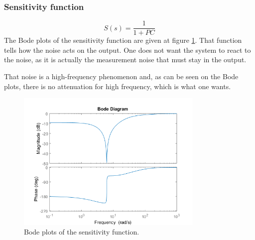 \subsubsection{Sensitivity function}
$$
S(s) = \dfrac{1}{1 + PC}
$$
The Bode plots of the sensitivity function are given at figure \ref{fig:sensitivity}. That function tells how the noise acts on the output. One does not want the system to react to the noise, as it is actually the measurement noise that must stay in the output.\par
That noise is a high-frequency phenomenon and, as can be seen on the Bode plots, there is no attenuation for high frequency, which is what one wants.
\begin{figure}[H]
    \centering
    \includegraphics[width=0.8\textwidth]{resources/png/sensitivity.png}
    \caption{Bode plots of the sensitivity function.}
    \label{fig:sensitivity}
\end{figure}

